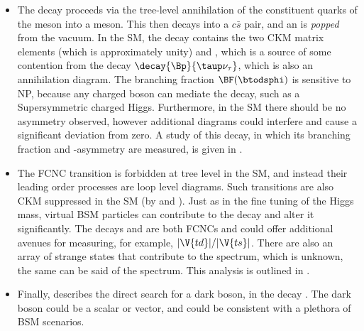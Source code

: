    \begin{itemize}
      \item
        The decay \btodsphi proceeds via the tree-level annihilation of the constituent quarks of the \Bp
        meson into a \Wp meson.
        This then decays into a $c\bar s$ pair, and an \ssbar is \emph{popped} from the vacuum.
        In the SM, the decay contains the two CKM matrix elements  (which is approximately unity) and
        , which is a source of some contention from the decay $\decay{\Bp}{\taup\nu_\tau}$, which
        is also an annihilation diagram.
        The branching fraction $\BF(\btodsphi)$ is sensitive to NP, because any charged boson can mediate
        the decay, such as a Supersymmetric charged Higgs.
        Furthermore, in the SM there should be no \CP asymmetry observed, however additional diagrams could
        interfere and cause a significant deviation from zero.
        A study of this decay, in which its branching fraction and \CP-asymmetry are measured, is given in
        .
      \item
        The FCNC transition  is forbidden at tree level in the SM, and instead their
        leading order processes are loop level diagrams.
        Such transitions are also CKM suppressed in the SM (by  and ).
        Just as in the fine tuning of the Higgs mass, virtual BSM particles can contribute to the decay and
        alter it significantly.
        The decays \btokpipimumu and \btophikmumu are both  FCNCs and could offer
        additional avenues for measuring, for example, $|\V{td}|/|\V{ts}|$.
        There are also an array of strange states that contribute to the \kpipi spectrum, which is unknown,
        the same can be said of the \phik spectrum.
        This analysis is outlined in .
      \item
        Finally,  describes the direct search for a dark boson, \decay{\db}{\mumu} in the
        decay \decay{\Bd}{\Kstarent\mumu}.
        The dark boson could be a scalar or vector, and could be consistent with a plethora of BSM
        scenarios.
    \end{itemize}








